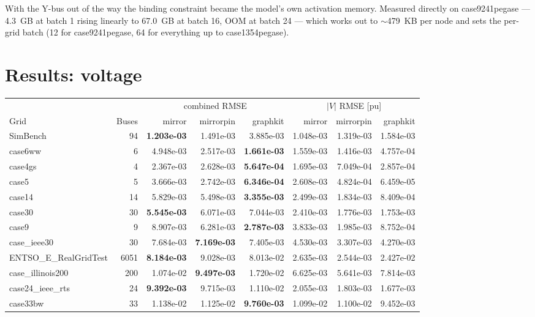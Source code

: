 \documentclass[10pt]{article}
\begin{document}
With the Y-bus out of the way the binding constraint became the model's own
activation memory. Measured directly on case9241pegase --- 4.3~GB at batch 1
rising linearly to 67.0~GB at batch 16, OOM at batch 24 --- which works out to
$\sim$479~KB per node and sets the per-grid batch (12 for case9241pegase, 64 for
everything up to case1354pegase).

\section{Results: voltage}

\begin{table}[H]
\centering
\small
\begin{tabular}{lrrrrrrr}
\toprule
 & & \multicolumn{3}{c}{combined RMSE} & \multicolumn{3}{c}{$|V|$ RMSE [pu]} \\
\cmidrule(lr){3-5}\cmidrule(lr){6-8}
Grid & Buses & mirror & mirrorpin & graphkit & mirror & mirrorpin & graphkit \\
\midrule
SimBench & 94 & \textbf{1.203e-03} & 1.491e-03 & 3.885e-03 & 1.048e-03 & 1.319e-03 & 1.584e-03 \\
case6ww & 6 & 4.948e-03 & 2.517e-03 & \textbf{1.661e-03} & 1.559e-03 & 1.416e-03 & 4.757e-04 \\
case4gs & 4 & 2.367e-03 & 2.628e-03 & \textbf{5.647e-04} & 1.695e-03 & 7.049e-04 & 2.857e-04 \\
case5 & 5 & 3.666e-03 & 2.742e-03 & \textbf{6.346e-04} & 2.608e-03 & 4.824e-04 & 6.459e-05 \\
case14 & 14 & 5.829e-03 & 5.498e-03 & \textbf{3.355e-03} & 2.499e-03 & 1.834e-03 & 8.409e-04 \\
case30 & 30 & \textbf{5.545e-03} & 6.071e-03 & 7.044e-03 & 2.410e-03 & 1.776e-03 & 1.753e-03 \\
case9 & 9 & 8.907e-03 & 6.281e-03 & \textbf{2.787e-03} & 3.833e-03 & 1.985e-03 & 8.752e-04 \\
case\_ieee30 & 30 & 7.684e-03 & \textbf{7.169e-03} & 7.405e-03 & 4.530e-03 & 3.307e-03 & 4.270e-03 \\
ENTSO\_E\_RealGridTest & 6051 & \textbf{8.184e-03} & 9.028e-03 & 8.013e-02 & 2.635e-03 & 2.544e-03 & 2.427e-02 \\
case\_illinois200 & 200 & 1.074e-02 & \textbf{9.497e-03} & 1.720e-02 & 6.625e-03 & 5.641e-03 & 7.814e-03 \\
case24\_ieee\_rts & 24 & \textbf{9.392e-03} & 9.715e-03 & 1.110e-02 & 2.055e-03 & 1.803e-03 & 1.677e-03 \\
case33bw & 33 & 1.138e-02 & 1.125e-02 & \textbf{9.760e-03} & 1.099e-02 & 1.100e-02 & 9.452e-03 \\

\end{tabular}
\end{table}
\end{document}
